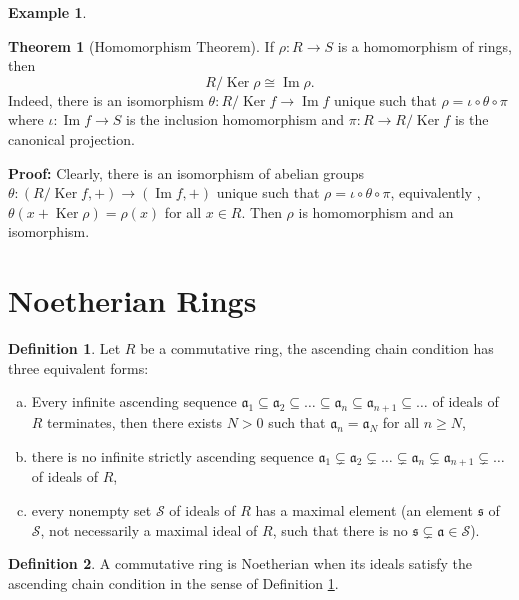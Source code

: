 \documentclass[11pt]{amsbook}%
\newcommand{\ii}{\item}
\theoremstyle{plain}
\theoremstyle{definition}
\newtheorem{definition*}{Definition}
\newtheorem*{example*}{Example}
\newtheorem{theorem}{Theorem}
\numberwithin{equation}{section}
\newcommand{\SC}{\mathcal S}
\newcommand{\af}{\mathfrak a}
\newcommand{\sff}{\mathfrak s}
\renewcommand{\proof}{ \textbf{Proof: }}
\DeclareMathOperator{\Ker}{Ker}
\DeclareMathOperator{\im}{Im}
\begin{document}
\begin{example*}
\begin{theorem}[Homomorphism Theorem]
  If $\rho: R \longrightarrow S$ is a homomorphism of rings, then
  $$
  R/\Ker \rho \cong \im \rho.
  $$
  Indeed, there is an isomorphism $\theta: R/\Ker f \longrightarrow \im f$ unique such that
  $\rho = \iota \circ \theta \circ \pi$ where $\iota: \im f \longrightarrow S$ is the 
  inclusion homomorphism and $\pi: R \longrightarrow R/\Ker f$ is the canonical projection.
\end{theorem} \vspace{1.8em}
\proof Clearly, there is an isomorphism of abelian groups $\theta: (R/\Ker f, +) \longrightarrow (\im f, +)$ 
unique such that $\rho = \iota \circ \theta \circ \pi$, equivalently , $\theta(x + \Ker \rho) = \rho(x)$
for all $x \in R$. Then $\rho$ is homomorphism and an isomorphism. \qedsymbol

\section{Noetherian Rings}

\begin{definition*}
  \label{def-ascending-chain}
  Let $R$ be a commutative ring, the ascending chain condition has three equivalent forms:
  \begin{enumerate}[a. ]
      \ii Every infinite ascending sequence $\af_{1} \subseteq \af_{2} \subseteq \dots \subseteq \af_{n} \subseteq \af_{n+1} \subseteq \dots$
      of ideals of $R$ terminates, then there exists $N > 0$ such that $\af_{n} = \af_{N}$ for all $n \geq N$, \label{(a)}
      \ii there is no infinite strictly ascending sequence $\af_{1} \subsetneq \af_{2} \subsetneq \dots \subsetneq \af_{n} \subsetneq \af_{n+1} \subsetneq \dots$
      of ideals of $R$, \label{(b)}
      \ii every nonempty set $\SC$ of ideals of $R$ has a maximal element (an element $\sff$ of $\SC$,
      not necessarily a maximal ideal of $R$, such that there is no $\sff \subsetneq \af \in \SC$). \label{(c)}
  \end{enumerate}
\end{definition*}

\begin{definition*}
  \label{def-noetherian-ring}
  A commutative ring is Noetherian when its ideals satisfy the ascending chain condition in the sense
  of Definition \ref{def-ascending-chain}.
\end{definition*}


\end{example*}
\end{document}
